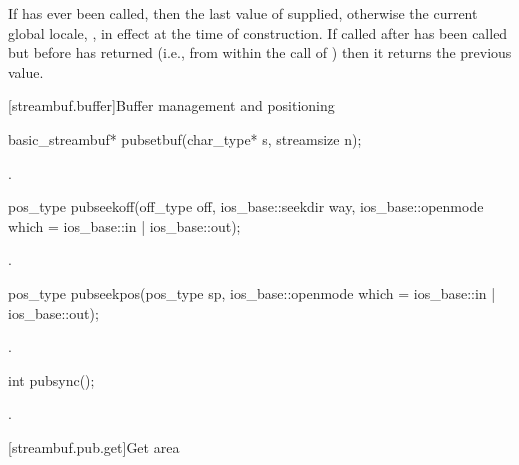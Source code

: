 \begin{itemdescr}
\pnum
\returns
If
has ever been called, then the last value of  supplied,
otherwise the current global locale,
,
in effect at the time of construction.
If called after
has been called but before
has returned (i.e., from within the call of
)
then it returns the previous value.
\end{itemdescr}

[streambuf.buffer]{Buffer management and positioning}

%
\begin{itemdecl}
basic_streambuf* pubsetbuf(char_type* s, streamsize n);
\end{itemdecl}

\begin{itemdescr}
\pnum
\returns
{}.
\end{itemdescr}

%
\begin{itemdecl}
pos_type pubseekoff(off_type off, ios_base::seekdir way,
                    ios_base::openmode which
                      = ios_base::in | ios_base::out);
\end{itemdecl}

\begin{itemdescr}
\pnum
\returns
{}.
\end{itemdescr}

%
\begin{itemdecl}
pos_type pubseekpos(pos_type sp,
                    ios_base::openmode which
                      = ios_base::in | ios_base::out);
\end{itemdecl}

\begin{itemdescr}
\pnum
\returns
{}.
\end{itemdescr}

%
\begin{itemdecl}
int pubsync();
\end{itemdecl}

\begin{itemdescr}
\pnum
\returns
{}.
\end{itemdescr}

[streambuf.pub.get]{Get area}


